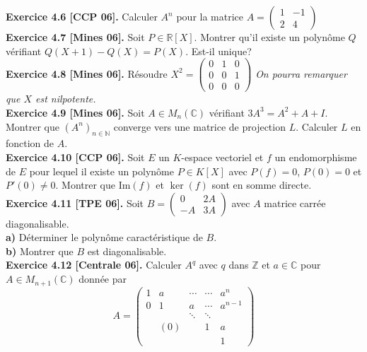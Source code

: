 \documentclass[a4paper,12pt,francais]{article}
\newcommand{\field}[1]{\mathbb{#1}}
\newcommand{\N}{\field{N}}
\newcommand{\Z}{\field{Z}}
\newcommand{\R}{\field{R}}
\newcommand{\C}{\field{C}}
\newcommand{\im}{\mbox{Im}}
\begin{document}
\noindent
{\bf Exercice 4.6 [CCP 06].} Calculer $A^n$ pour la matrice 
$\displaystyle A=\left(\begin{array}{cc}
1&-1\\
2&4
\end{array}
\right)$\\

\noindent
{\bf Exercice 4.7 [Mines 06].} Soit $P\in \R[X]$. Montrer qu'il existe
un polynôme $Q$ vérifiant $Q(X+1)-Q(X)=P(X)$. Est-il unique?\\

\noindent
{\bf Exercice 4.8 [Mines 06].} Résoudre $X^2=\left(\begin{array}{ccc}
0&1&0\\
0&0&1\\
0&0&0
\end{array} \right)$ {\it On pourra remarquer que $X$ est nilpotente.}\\

\noindent
{\bf Exercice 4.9 [Mines 06].} Soit $A\in M_n(\C)$ vérifiant
$3A^3=A^2+A+I$. Montrer que $(A^n)_{n \in \N}$ converge vers une
matrice de projection $L$. Calculer $L$ en fonction de $A$.\\

\noindent
{\bf Exercice 4.10 [CCP 06].} Soit $E$ un $K$-espace vectoriel et $f$
un endomorphisme de $E$ pour lequel il existe un polynôme $P\in K[X]$
avec $P(f)=0$, $P(0)=0$ et $P'(0)\neq 0$. Montrer que $\im(f)$ et
$\ker(f)$ sont en somme directe.\\
 
\noindent
{\bf Exercice 4.11 [TPE 06].} Soit $B=\left(\begin{array}{cc}
0&2A\\
-A&3A
\end{array}
\right)$ avec $A$ matrice carrée diagonalisable.\\
\indent
{\bf a)} Déterminer le polynôme caractéristique de $B$.\\
\indent
{\bf b)} Montrer que $B$ est diagonalisable.\\

\noindent
{\bf Exercice 4.12 [Centrale 06].} Calculer $A^q$ avec $q$ dans $\Z$
et $a\in \C$ pour $A \in M_{n+1}(\C)$ donnée par
$$A=\left(
\begin{array}{ccccc}
1&a&\cdots& \cdots  &a^n\\
0&1&a&\cdots &a^{n-1}\\
&&\ddots& \ddots&\\
&(0)&&1&a\\
&&&&1
\end{array}
\right) $$
\end{document}
